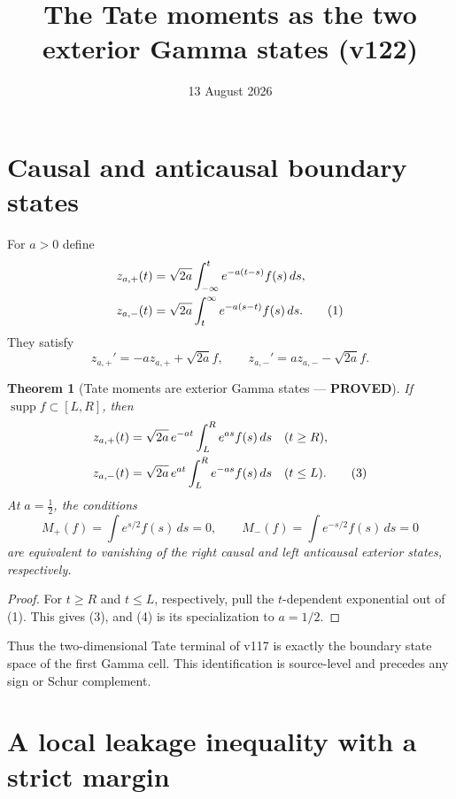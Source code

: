 \documentclass[11pt]{article}
\title{The Tate moments as the two exterior Gamma states (v122)}
\date{13 August 2026}
\newcommand{\PROVED}{\textcolor{green!40!black}{\textbf{PROVED}}}
\newtheorem{theorem}{Theorem}
\begin{document}
\maketitle

\section{Causal and anticausal boundary states}

For $a>0$ define
\begin{align}
 z_{a,+}(t)&=\sqrt{2a}\int_{-\infty}^t
                  e^{-a(t-s)}f(s)\,ds,\notag\\
 z_{a,-}(t)&=\sqrt{2a}\int_t^\infty
                  e^{-a(s-t)}f(s)\,ds.                       \tag{1}
\end{align}
They satisfy
\begin{equation}
 z_{a,+}'=-az_{a,+}+\sqrt{2a}f,\qquad
 z_{a,-}'=az_{a,-}-\sqrt{2a}f.                              \tag{2}
\end{equation}

\begin{theorem}[Tate moments are exterior Gamma states --- \PROVED]
If $\operatorname{supp}f\subset[L,R]$, then
\begin{align}
 z_{a,+}(t)&=\sqrt{2a}\,e^{-at}
       \int_L^Re^{as}f(s)\,ds &&(t\ge R),\notag\\
 z_{a,-}(t)&=\sqrt{2a}\,e^{at}
       \int_L^Re^{-as}f(s)\,ds &&(t\le L).                   \tag{3}
\end{align}
At $a=\frac12$, the conditions
\begin{equation}
 M_+(f)=\int e^{s/2}f(s)\,ds=0,\qquad
 M_-(f)=\int e^{-s/2}f(s)\,ds=0                             \tag{4}
\end{equation}
are equivalent to vanishing of the right causal and left anticausal
exterior states, respectively.
\end{theorem}

\begin{proof}
For $t\ge R$ and $t\le L$, respectively, pull the $t$-dependent exponential
out of (1).  This gives (3), and (4) is its specialization to $a=1/2$.
\end{proof}

Thus the two-dimensional Tate terminal of v117 is exactly the boundary
state space of the first Gamma cell.  This identification is source-level
and precedes any sign or Schur complement.

\section{A local leakage inequality with a strict margin}
\end{document}
